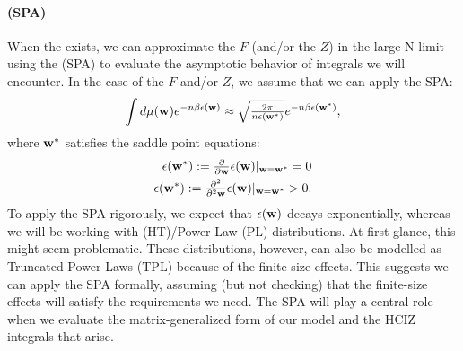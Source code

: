 \paragraph{\SaddlePointApproximation (SPA)}
When the \ThermodynamicLimit exists, 
we can approximate the  \FreeEnergy $F$ 
(and/or the \PartitionFunction $Z$) in the large-N limit
using the \SaddlePointApproximation (SPA) to evaluate the asymptotic behavior of 
integrals we will encounter.
In the case of the $F$ and/or $Z$, we assume that we can apply the SPA:
\begin{align}
  \label{eqn:SPA}
  \int d\mu({\mathbf{w}}) e^{-n\beta\epsilon({\mathbf{w}})}\approx \sqrt{\tfrac{2\pi}{n\epsilon({\mathbf{w}}^{*})}} e^{-n\beta\epsilon({\mathbf{w}}^{*})}  ,
\end{align}
where ${\mathbf{w}}^{*}$ satisfies the saddle point equations:
\begin{align}
  \epsilon({\mathbf{w}}^{*}):=\tfrac{\partial}{\partial {\mathbf{w}}}\epsilon({\mathbf{w}})\vert_{{\mathbf{w}}={\mathbf{w}}^{*}}=0 \\
  \epsilon({\mathbf{w}}^{*}):=\tfrac{\partial^{2}}{\partial^{2} {\mathbf{w}}}\epsilon({\mathbf{w}})\vert_{{\mathbf{w}}={\mathbf{w}}^{*}}>0  .
\end{align}
To apply the SPA rigorously, we expect that $\epsilon({\mathbf{w}})$ decays exponentially,
whereas we will be working with \HeavyTailed (HT)/Power-Law (PL) distributions.
At first glance, this might seem problematic.
These distributions, however, can also be modelled as Truncated Power Laws (TPL) because of the finite-size effects. 
This suggests we can apply the SPA formally, assuming (but not checking) that the finite-size effects will satisfy the requirements we need.
The SPA will play a central role when we evaluate the matrix-generalized form of our model and the HCIZ integrals that arise.

